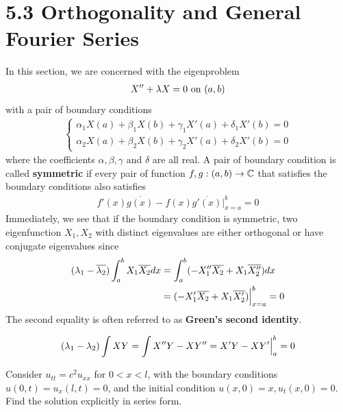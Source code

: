 \documentclass{report}
\begin{document}
\section{5.3 Orthogonality and General Fourier Series} 
\begin{mdframed}
In this section, we are concerned with the eigenproblem 
\begin{align*}
X''+\lambda  X= 0\text{ on }(a,b)
\end{align*}
with a pair of boundary conditions 
\begin{align*}
\begin{cases}
  \alpha_1 X(a)+ \beta _1 X(b)+ \gamma_1 X'(a)+ \delta_1 X'(b)=0 \\
  \alpha_2 X(a) + \beta _2 X(b)+ \gamma _2 X'(a)+ \delta_2 X'(b)=0
\end{cases}
\end{align*}
where the coefficients $\alpha ,\beta ,\gamma\text{ and }\delta$ are all real. A pair of boundary condition is called \textbf{symmetric} if every pair of function $f,g:(a,b)\rightarrow \mathbb{C}$ that satisfies the boundary conditions also satisfies   
\begin{align*}
  f'(x)\overline{g(x)}-f(x)\overline{g'(x)} \Big|_{x=a}^b =0
\end{align*}
Immediately, we see that if the boundary condition is symmetric, two eigenfunction $X_1,X_2$ with distinct eigenvalues are either orthogonal or have conjugate eigenvalues since 
 \begin{align*}
   (\lambda _1- \overline{\lambda _2})\int_a^b X_1  \overline{X_2} dx&= \int_a^b (-X_1''\overline{ X_2}+ X_1\overline{X_2''})dx \\
                                                                      &= (-X_1'\overline{X_2}+X_1\overline{X_2'})\Big|_{x=a}^b=0
\end{align*}
The second equality is often referred to as \textbf{Green's second identity}. 
\end{mdframed}
\begin{mdframed}
\begin{align*}
  (\lambda_1 - \lambda _2) \int XY = \int X''Y-XY''= X'Y- XY' \Big|_{a}^b = 0
\end{align*}
\end{mdframed}
\begin{question}{}{}
Consider $u_{tt}=c^2 u_{xx}$ for $0<x<l$, with the boundary conditions  $u (0,t)=u_x(l,t)=0$, and the initial condition $u(x,0)=x,u_t(x,0)=0$. Find the solution explicitly in series form. 
\end{question}
\end{document}
